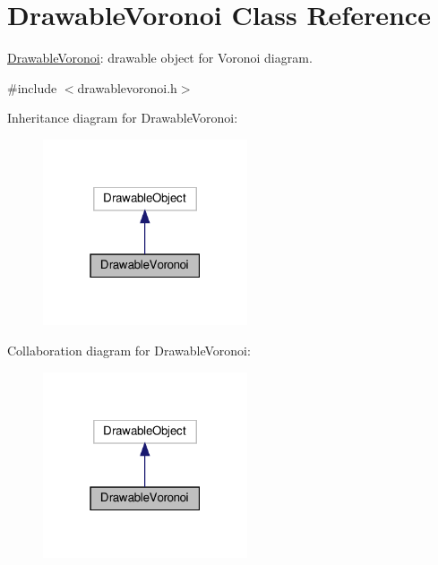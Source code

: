 \hypertarget{classDrawableVoronoi}{}\section{Drawable\+Voronoi Class Reference}
\label{classDrawableVoronoi}


\hyperlink{classDrawableVoronoi}{Drawable\+Voronoi}\+: drawable object for Voronoi diagram.  




{\ttfamily \#include $<$drawablevoronoi.\+h$>$}



Inheritance diagram for Drawable\+Voronoi\+:\nopagebreak
\begin{figure}[H]
\begin{center}
\leavevmode
\includegraphics[width=171pt]{classDrawableVoronoi__inherit__graph}
\end{center}
\end{figure}


Collaboration diagram for Drawable\+Voronoi\+:\nopagebreak
\begin{figure}[H]
\begin{center}
\leavevmode
\includegraphics[width=171pt]{classDrawableVoronoi__coll__graph}
\end{center}
\end{figure}

